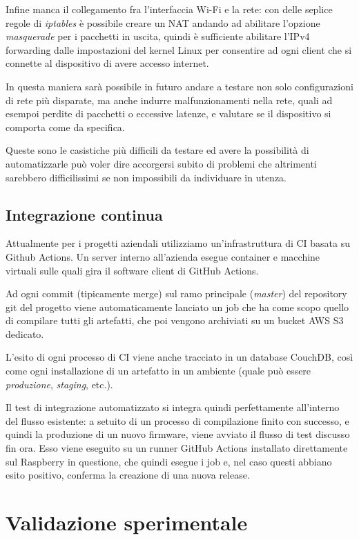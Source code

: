 \documentclass[12pt,a4paper,twoside,titlepage]{book}
\begin{document}
Infine manca il collegamento fra l'interfaccia Wi-Fi e la rete: con delle seplice
regole di \textit{iptables} è possibile creare un NAT andando ad abilitare l'opzione
\textit{masquerade} per i pacchetti in uscita, quindi è sufficiente abilitare l'IPv4
forwarding dalle impostazioni del kernel Linux per consentire ad ogni client che si
connette al dispositivo di avere accesso internet.

In questa maniera sarà possibile in futuro andare a testare non solo configurazioni
di rete più disparate, ma anche indurre malfunzionamenti nella rete, quali  ad esempoi
perdite di pacchetti o eccessive latenze, e valutare se il dispositivo si comporta come
da specifica.

Queste sono le casistiche più difficili da testare ed avere la possibilità di automatizzarle
può voler dire accorgersi subito di problemi che altrimenti sarebbero difficilissimi
se non impossibili da individuare in utenza.


\section{Integrazione continua}

Attualmente per i progetti aziendali utilizziamo un'infrastruttura di CI basata
su Github Actions. Un server interno all'azienda esegue container e macchine virtuali
sulle quali gira il software client di GitHub Actions.

Ad ogni commit (tipicamente merge) sul ramo principale (\textit{master}) del repository
git del progetto viene automaticamente lanciato un job che ha come scopo quello
di compilare tutti gli artefatti, che poi vengono archiviati su un bucket AWS S3
dedicato.

L'esito di ogni processo di CI viene anche tracciato in un database CouchDB,
così come ogni installazione di un artefatto in un ambiente (quale può essere
\textit{produzione}, \textit{staging}, etc.).

Il test di integrazione automatizzato si integra quindi perfettamente all'interno
del flusso esistente: a setuito di un processo di compilazione finito con successo,
e quindi la produzione di un nuovo firmware, viene avviato il flusso di test discusso
fin ora. Esso viene eseguito su un runner GitHub Actions installato direttamente
sul Raspberry in questione, che quindi esegue i job e, nel caso questi abbiano
esito positivo, conferma la creazione di una nuova release.

\chapter{Validazione sperimentale}
\end{document}
